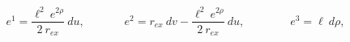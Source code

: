 \begin{equation}
e^{1}=\frac{\ell^{2}~e^{2\rho }}{2~r_{ex}}~du,\,\,\,\,\,\,\,\,\,\,\,\,\,\,\,\,\,\,\,\,\,e^{2}=r_{ex}~dv-
\frac{\ell^{2}~e^{2\rho
}}{2~
r_{ex}}~du,\,\,\,\,\,\,\,\,\,\,\,\,\,\,\,\,\,\,\,\,\,\,\,\,e^{3}=\ell ~d\rho ,
\label{15}
\end{equation}

